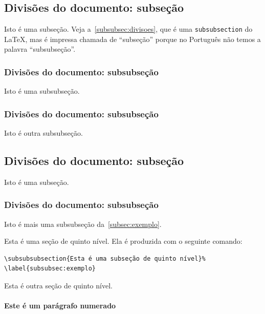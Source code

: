 \subsection{Divisões do documento: subseção}%
\label{subsec:divisoes}

Isto é uma subseção. Veja a~\autoref{subsubsec:divisoes}, que é uma
\texttt{subsubsection} do \LaTeX, mas é impressa chamada de ``subseção'' porque
no Português não temos a palavra ``subsubseção''.

\subsubsection{Divisões do documento: subsubseção}%
\label{subsubsec:divisoes}

Isto é uma subsubseção.

\subsubsection{Divisões do documento: subsubseção}

Isto é outra subsubseção.

\subsection{Divisões do documento: subseção}%
\label{subsec:exemplo}

Isto é uma subseção.

\subsubsection{Divisões do documento: subsubseção}

Isto é mais uma subsubseção da~\autoref{subsec:exemplo}.


%
\label{subsubsec:exemplo}

Esta é uma seção de quinto nível. Ela é produzida com o seguinte comando:

\begin{verbatim}
\subsubsubsection{Esta é uma subseção de quinto nível}%
\label{subsubsec:exemplo}
\end{verbatim}

%
\label{subsubsubsec:exemplo}

Esta é outra seção de quinto nível.


\paragraph{Este é um parágrafo numerado}%
\label{par:exemplo-paragrafo}

